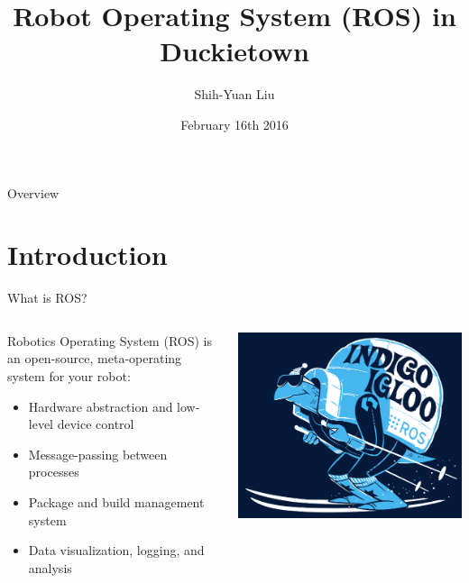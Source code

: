 \documentclass[aspectratio=43]{beamer}
\author[Shih-Yuan Liu]{Shih-Yuan Liu}
\title[ROS in Duckietown]{Robot Operating System (ROS) in Duckietown}
\institute[Duckietown MIT]{Duckietown, MIT}
\date[Feb. 16th, 2016]{February 16th 2016}
\begin{document}

\begin{frame}[plain,label=titlepage,noframenumbering] %
	\titlepage
\end{frame}

\begin{frame}[label=overview]{Overview}
	\tableofcontents
\end{frame}


\section{Introduction}

\begin{frame}{What is ROS?}
\begin{columns}
	\begin{column}{0.55\textwidth}
		Robotics Operating System (ROS) is an \alert{open-source}, \alert{meta-operating system} for your \alert{robot}:
		\begin{itemize}
			\item Hardware abstraction and low-level device control
			\item Message-passing between processes
			\item Package and build management system
			\item Data visualization, logging, and analysis
		\end{itemize}
	\end{column}
	\begin{column}{0.45\textwidth}
		\centering
		\includegraphics[width=\textwidth]{fig/indigoigloo_600.png}
	\end{column}
\end{columns}
\end{frame}
\end{document}

